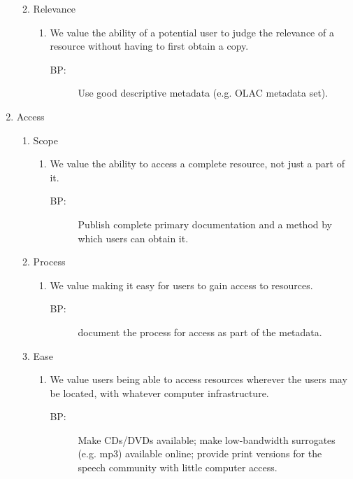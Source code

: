 \documentclass{article}
\begin{document}
\begin{enumerate}
\begin{enumerate}
\begin{enumerate}
\begin{description}
      \end{description}
    \end{enumerate}
    \item Relevance
    \begin{enumerate}
      \item We value the ability of a potential user to judge the relevance of a resource without having to first obtain a copy.
      \begin{description}
        \item[BP:]  Use good descriptive metadata (e.g. OLAC metadata set).
      \end{description}
    \end{enumerate}
  \end{enumerate}
  \item Access
  \begin{enumerate}
    \item Scope
    \begin{enumerate}
      \item We value the ability to access a complete resource, not just a part of it.
      \begin{description}
        \item[BP:]  Publish complete primary documentation and a method by which users can obtain it.
      \end{description}
    \end{enumerate}
    \item Process
    \begin{enumerate}
      \item We value making it easy for users to gain access to resources.
      \begin{description}
        \item[BP:]  document the process for access as part of the metadata.
      \end{description}
    \end{enumerate}
    \item Ease
    \begin{enumerate}
      \item We value users being able to access resources wherever the users may be located, with whatever computer infrastructure.
      \begin{description}
        \item[BP:]  Make CDs/DVDs available; make low-bandwidth surrogates (e.g. mp3) available online; provide print versions for the speech community with little computer access.
      \end{description}

\end{enumerate}
\end{enumerate}
\end{enumerate}
\end{document}

